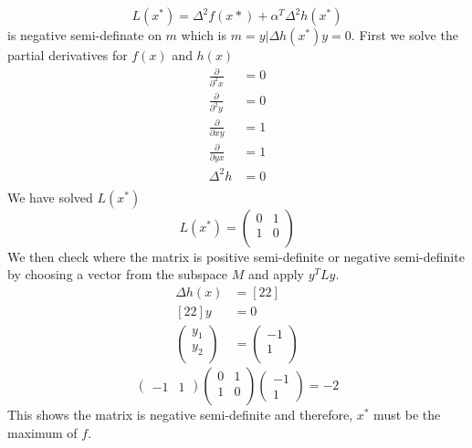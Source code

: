 \begin{equation}
L(x^*) = \Delta^2f(x*) + \alpha^T\Delta^2h(x^*)
\end{equation}
is negative semi-definate on $m$ which is $m = {y | \Delta h (x^*) y = 0}$. First we solve the partial derivatives for $f(x)$ and $h(x)$
\begin{equation*}
\begin{aligned}
\frac{\partial}{\partial^2 x} &= 0\\
\frac{\partial}{\partial^2 y} &= 0\\
\frac{\partial}{\partial xy} &= 1\\
\frac{\partial}{\partial yx} &= 1\\
\Delta^2 h &= 0\\
\end{aligned}
\end{equation*}
We have solved $L(x^*)$
\begin{equation*}
L(x^*) = 
\begin{pmatrix}
0 &1\\
1 &0\\
\end{pmatrix}
\end{equation*}
We then check where the matrix is positive semi-definite or negative semi-definite by choosing a vector from the subspace $M$ and apply $y^TLy$.
\begin{equation}
\begin{aligned}
\Delta h(x) &= [2 2]\\
[2 2]y &= 0\\
\begin{pmatrix}
y_1\\
y_2 \\
\end{pmatrix}
& = 
\begin{pmatrix}
-1 \\
1 \\
\end{pmatrix}
\end{aligned}
\end{equation} 
\begin{equation}
\begin{pmatrix}
-1 & 1 
\end{pmatrix}
\begin{pmatrix}
0 & 1 \\
1 & 0\\
\end{pmatrix}
\begin{pmatrix}
-1 \\
1
\end{pmatrix}
= -2
\end{equation}
This shows the matrix is negative semi-definite and therefore, $x^*$ must be the maximum of $f$.
